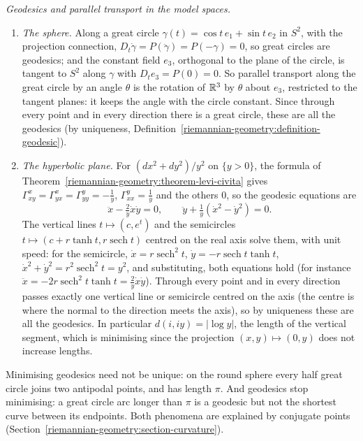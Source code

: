 \begin{example}\label{riemannian-geometry:example-geodesics-models}
\emph{Geodesics and parallel transport in the model spaces.}
\begin{enumerate}
\item \emph{The sphere.} Along a great circle $\gamma(t) = \cos t\,e_1 + \sin t\,e_2$ in $S^2$, with the projection connection, $D_t\dot\gamma = P(\ddot\gamma) = P(-\gamma) = 0$, so great circles are geodesics; and
the constant field $e_3$, orthogonal to the plane of the circle, is tangent to $S^2$ along $\gamma$ with $D_te_3 = P(0) = 0$. So parallel transport along the great circle by an angle $\theta$ is the rotation of
$\mathbb{R}^3$ by $\theta$ about $e_3$, restricted to the tangent planes: it keeps the angle with the circle constant. Since through every point and in every direction there is a great circle, these are all the
geodesics (by uniqueness, Definition~\ref{riemannian-geometry:definition-geodesic}).
\item \emph{The hyperbolic plane.} For $(dx^2 + dy^2)/y^2$ on $\{y > 0\}$, the formula of Theorem~\ref{riemannian-geometry:theorem-levi-civita} gives $\Gamma^x_{xy} = \Gamma^x_{yx} = \Gamma^y_{yy} = -\frac1y$,
$\Gamma^y_{xx} = \frac1y$ and the others $0$, so the geodesic equations are
\[
\ddot x - \tfrac2y\dot x\dot y = 0, \qquad \ddot y + \tfrac1y(\dot x^2 - \dot y^2) = 0 .
\]
The vertical lines $t \mapsto (c, e^t)$ and the semicircles $t \mapsto (c + r\tanh t, r\operatorname{sech}t)$ centred on the real axis solve them, with unit speed: for the semicircle,
$\dot x = r\operatorname{sech}^2t$, $\dot y = -r\operatorname{sech}t\tanh t$, $\dot x^2 + \dot y^2 = r^2\operatorname{sech}^2t = y^2$, and substituting, both equations hold (for instance
$\ddot x = -2r\operatorname{sech}^2t\tanh t = \frac2y\dot x\dot y$). Through every point and in every direction passes exactly one vertical line or semicircle centred on the axis (the centre is where the
normal to the direction meets the axis), so by uniqueness these are all the geodesics. In particular $d(i, iy) = |\log y|$, the length of the vertical segment, which is minimising since the projection
$(x, y) \mapsto (0, y)$ does not increase lengths.
\end{enumerate}
\end{example}

\begin{remark}\label{riemannian-geometry:remark-non-unique-geodesics}
Minimising geodesics need not be unique: on the round sphere every half great circle joins two antipodal points, and has length $\pi$. And geodesics stop minimising: a great circle arc longer than $\pi$ is a geodesic
but not the shortest curve between its endpoints. Both phenomena are explained by conjugate points (Section~\ref{riemannian-geometry:section-curvature}).
\end{remark}

